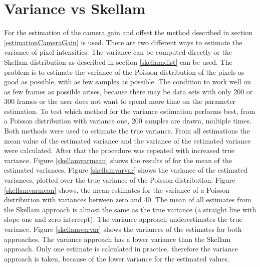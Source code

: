 \section{Variance vs Skellam}\label{skellambettervariance}
For the estimation of the camera gain and offset the method described in section \ref{estimationCameraGain} is used. There are two different ways to estimate the variance of pixel intensities.\newline
The variance can be computed directly or the Skellam distribution as described in section \ref{skellamdist} can be used.\newline
The problem is to estimate the variance of the Poisson distribution of the pixels as good as possible, with as few samples as possible. The condition to work well on as few frames as possible arises, because there may be data sets with only 200 or 300 frames or the user does not want to spend more time on the parameter estimation.\newline
To test which method for the variance estimation performs best, from a Poisson distribution with variance one, 200 samples are drawn, multiple times. Both methods were used to estimate the true variance. From all estimations the mean value of the estimated variance and the variance of the estimated variance were calculated. After that the procedure was repeated with increased true variance.\newline
Figure \ref{skellamvarmean} shows the results of for the mean of the estimated variances, Figure \ref{skellamvarvar} shows the variance of the estimated variances, plotted over the true variance of the Poisson distribution.\newline
Figure \ref{skellamvarmean} shows, the mean estimates for the variance of a Poisson distribution with variances between zero and 40. The mean of all estimates from the Skellam approach is almost the same as the true variance (a straight line with slope one and zero intercept). The variance approach underestimates the true variance. Figure \ref{skellamvarvar} shows the variances of the estimates for both approaches. The variance approach has a lower variance than the Skellam approach.\newline
Only one estimate is calculated in practice, therefore the variance approach is taken, because of the lower variance for the estimated values.

